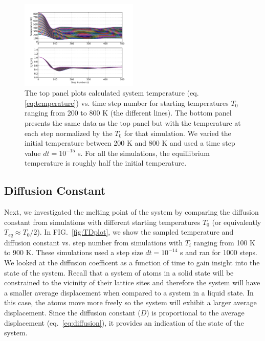 \documentclass[10pt,showpacs,preprintnumbers,footinbib,amsmath,amssymb,aps,prl,twocolumn,groupedaddress,superscriptaddress,showkeys]{revtex4-1}
\newcommand{\pwrten}[1]{%
	\ensuremath{10^{#1}} }
\begin{document}
\begin{figure}
\centering
	\includegraphics[width=0.5\textwidth]{figures/TempSteps.pdf}
	\caption{The top panel plots calculated system temperature
	(eq.\ref{eq:temperature}) vs. time step
	number for starting temperatures $T_0$ ranging from 200 to 800
	K (the different lines). The bottom panel presents the same data
	as the top panel but with the temperature at each step normalized
	by the $T_0$ for that simulation. We varied the initial temperature
	between 200 K and 800 K and used a time step
	value $dt = \pwrten{-15}$ s.
	For all the simulations, the
	equillibrium temperature is roughly half the initial temperature.}
	\label{fig:tempsteps}
\end{figure}


\subsection*{Diffusion Constant}

Next, we investigated the melting point of the system by comparing the
diffusion constant from simulations with different starting temperatures
$T_0$ (or equivalently $T_{eq} \approx T_0/2$).
In FIG.~\ref{fig:TDplot}, we show the sampled temperature and
diffusion constant vs. step number from simulations with $T_i$ ranging
from 100 K to 900 K. These simulations used a step size $dt = \pwrten{-14}$
s and ran for 1000 steps. We looked at the diffusion coefficent as a
function of time to gain insight into the state of the system. Recall that
a system of atoms in a solid state will be constrained to the vicinity of
their lattice sites and therefore the system will have a smaller average
displacement when compared to a system in a liquid state. In this case,
the atoms move more freely so the system will exhibit a larger average
displacement. Since the diffusion constant ($D$) is proportional to the
average
displacement (eq.~\ref{eq:diffusion}), it provides an indication of the
state of the system.
\end{document}
